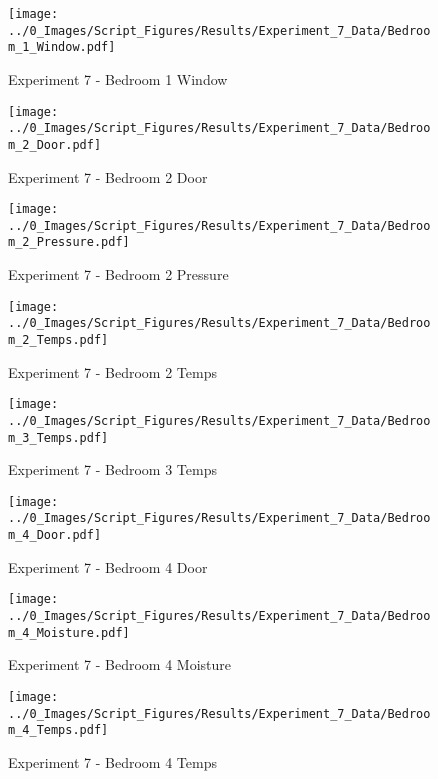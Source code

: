 	\clearpage

	\begin{figure}[H]
		\centering
		\texttt{[image: ../0\_Images/Script\_Figures/Results/Experiment\_7\_Data/Bedroom\_1\_Window.pdf]}
		\caption[]{Experiment 7 - Bedroom 1 Window}
	\end{figure}
 

	\begin{figure}[H]
		\centering
		\texttt{[image: ../0\_Images/Script\_Figures/Results/Experiment\_7\_Data/Bedroom\_2\_Door.pdf]}
		\caption[]{Experiment 7 - Bedroom 2 Door}
	\end{figure}
 
	\clearpage

	\begin{figure}[H]
		\centering
		\texttt{[image: ../0\_Images/Script\_Figures/Results/Experiment\_7\_Data/Bedroom\_2\_Pressure.pdf]}
		\caption[]{Experiment 7 - Bedroom 2 Pressure}
	\end{figure}
 

	\begin{figure}[H]
		\centering
		\texttt{[image: ../0\_Images/Script\_Figures/Results/Experiment\_7\_Data/Bedroom\_2\_Temps.pdf]}
		\caption[]{Experiment 7 - Bedroom 2 Temps}
	\end{figure}
 
	\clearpage

	\begin{figure}[H]
		\centering
		\texttt{[image: ../0\_Images/Script\_Figures/Results/Experiment\_7\_Data/Bedroom\_3\_Temps.pdf]}
		\caption[]{Experiment 7 - Bedroom 3 Temps}
	\end{figure}
 

	\begin{figure}[H]
		\centering
		\texttt{[image: ../0\_Images/Script\_Figures/Results/Experiment\_7\_Data/Bedroom\_4\_Door.pdf]}
		\caption[]{Experiment 7 - Bedroom 4 Door}
	\end{figure}
 
	\clearpage

	\begin{figure}[H]
		\centering
		\texttt{[image: ../0\_Images/Script\_Figures/Results/Experiment\_7\_Data/Bedroom\_4\_Moisture.pdf]}
		\caption[]{Experiment 7 - Bedroom 4 Moisture}
	\end{figure}
 

	\begin{figure}[H]
		\centering
		\texttt{[image: ../0\_Images/Script\_Figures/Results/Experiment\_7\_Data/Bedroom\_4\_Temps.pdf]}
		\caption[]{Experiment 7 - Bedroom 4 Temps}
	\end{figure}
 
